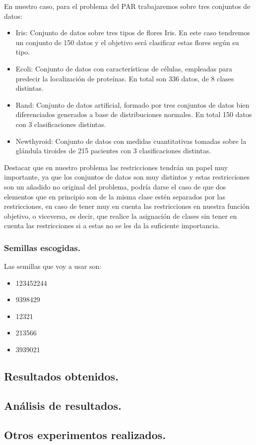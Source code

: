 \documentclass[12pt, spanish]{article}
\begin{document}
En nuestro caso, para el problema del PAR trabajaremos sobre tres conjuntos de datos:

\begin{itemize}
	\item{Iris: Conjunto de datos sobre tres tipos de flores Iris. En este caso tendremos un conjunto de 150 datos y el objetivo será clasificar estas flores según su tipo.}
	\item{Ecoli: Conjunto de datos con características de células, empleadas para predecir la localización de proteínas. En total son 336 datos, de 8 clases distintas.}
	\item{Rand: Conjunto de datos artificial, formado por tres conjuntos de datos bien diferenciados generados a base de distribuciones normales. En total 150 datos con 3 clasificaciones distintas.}
	\item{Newthyroid: Conjunto de datos con medidas cuantitativas tomadas sobre la glándula tiroides de 215 pacientes con 3 clasificaciones distintas.} 
\end{itemize}

Destacar que en nuestro problema las restricciones tendrán un papel muy importante, ya que los conjuntos de datos son muy distintos y estas restricciones son un añadido no original del problema, podría darse el caso de que dos elementos que en principio son de la misma clase estén separados por las restricciones, en caso de tener muy en cuenta las restricciones en nuestra función objetivo, o viceversa, es decir, que realice la asignación de clases sin tener en cuenta las restricciones si a estas no se les da la suficiente importancia.



\subsubsection{Semillas escogidas.}

Las semillas que voy a usar son:

\begin{itemize}
	\item {123452244}
	\item {9398429}
	\item {12321}
	\item {213566}
	\item {3939021}
\end{itemize}

\newpage

\subsection{Resultados obtenidos.}


\newpage


\subsection{Análisis de resultados.	}

\subsection{Otros experimentos realizados.}
\end{document}
